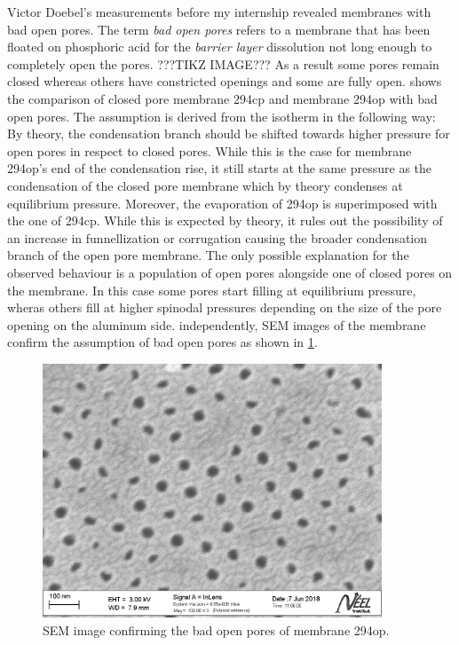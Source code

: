 \documentclass[../thesis.tex]{subfiles}
\begin{document}
        

        Victor Doebel's measurements before my internship revealed membranes with bad open pores. The term \textit{bad open pores} refers to a membrane that has been floated on phosphoric acid for the \textit{barrier layer} dissolution not long enough to completely open the pores. ???TIKZ IMAGE??? As a result some pores remain closed whereas others have constricted openings and some are fully open.  shows the comparison of closed pore membrane 294cp and membrane 294op with bad open pores. The assumption is derived from the isotherm in the following way: By theory, the condensation branch should be shifted towards higher pressure for open pores in respect to closed pores. While this is the case for membrane 294op's end of the condensation rise, it still starts at the same pressure as the condensation of the closed pore membrane which by theory condenses at equilibrium pressure. Moreover, the evaporation of 294op is superimposed with the one of 294cp. While this is expected by theory, it rules out the possibility of an increase in funnellization or corrugation causing the broader condensation branch of the open pore membrane. The only possible explanation for the observed behaviour is a population of open pores alongside one of closed pores on the membrane. In this case some pores start filling at equilibrium pressure, wheras others fill at higher spinodal pressures depending on the size of the pore opening on the aluminum side. independently, SEM images of the membrane confirm the assumption of bad open pores as shown in \cref{fig:294-sem}.

        \begin{figure}[tbp]
          \centering
          \includegraphics[width=0.9\textwidth]{images/294_bad_open_pores.jpg}
          \caption{SEM image confirming the bad open pores of membrane 294op.}
          \label{fig:294-sem}
        \end{figure}
\end{document}
